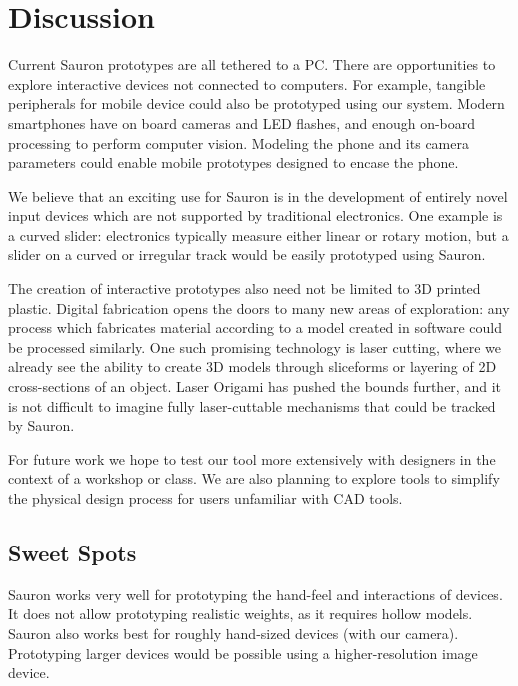 \section{Discussion}

Current Sauron prototypes are all tethered to a PC. There are opportunities to explore interactive devices not connected to computers. For example, tangible peripherals for mobile device could also be prototyped using our system. Modern smartphones have on board cameras and LED flashes, and enough on-board processing to perform computer vision. Modeling the phone and its camera parameters could enable mobile prototypes designed to encase the phone.

We believe that an exciting use for Sauron is in the development of entirely novel input devices which are not supported by traditional electronics. One example is a curved slider: electronics typically measure either linear or rotary motion, but a slider on a curved or irregular track would be easily prototyped using Sauron.

The creation of interactive prototypes also need not be limited to 3D printed plastic. Digital fabrication opens the doors to many new areas of exploration: any process which fabricates material according to a model created in software could be processed similarly. One such promising technology is laser cutting, where we already see the ability to create 3D models through sliceforms or layering of 2D cross-sections of an object. Laser Origami \cite{Mueller-laserorigami} has pushed the bounds further, and it is not difficult to imagine fully laser-cuttable mechanisms that could be tracked by Sauron.

For future work we hope to test our tool more extensively with designers in the context of a workshop or class. We are also planning to explore tools to simplify the physical design process for users unfamiliar with CAD tools. 

    \subsection{Sweet Spots}
    
    Sauron works very well for prototyping the hand-feel and interactions of devices. It does not allow prototyping realistic weights, as it requires hollow models. Sauron also works best for roughly hand-sized devices (with our camera). Prototyping larger devices would be possible using a higher-resolution image device.
    
